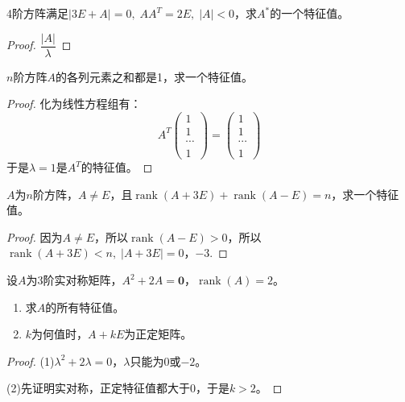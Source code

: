 \begin{theorem}
	4阶方阵满足$|3E+A|=0,\;AA^T=2E,\;|A|<0$，求$A^*$的一个特征值。
\end{theorem}
\begin{proof}
	$\dfrac{|A|}{\lambda}$
\end{proof}
\begin{theorem}
	$n$阶方阵$A$的各列元素之和都是1，求一个特征值。
\end{theorem}
\begin{proof}
	化为线性方程组有：
	\begin{equation*}
		A^T\begin{pmatrix}
			1 \\
			1 \\
			\cdots \\
			1
		\end{pmatrix}
		=\begin{pmatrix}
			1 \\
			1 \\
			\cdots \\
			1
		\end{pmatrix}
	\end{equation*}
	于是$\lambda=1$是$A^T$的特征值。
\end{proof}

\begin{theorem}
	$A$为$n$阶方阵，$A\ne E$，且$\operatorname{rank}(A+3E)+\operatorname{rank}(A-E)=n$，求一个特征值。
\end{theorem}
\begin{proof}
	因为$A\ne E$，所以$\operatorname{rank}(A-E)>0$，所以$\operatorname{rank}(A+3E)<n,\;|A+3E|=0$，$-3$.
\end{proof}

\begin{theorem}
	设$A$为$3$阶实对称矩阵，$A^2+2A=\mathbf{0}$，$\operatorname{rank}(A)=2$。
	\begin{enumerate}
		\item 求$A$的所有特征值。
		\item $k$为何值时，$A+kE$为正定矩阵。
	\end{enumerate}
\end{theorem}
\begin{proof}
	(1)$\lambda^2+2\lambda=0$，$\lambda$只能为$0$或$-2$。\par
	(2)先证明实对称，正定特征值都大于$0$，于是$k>2$。
\end{proof}


